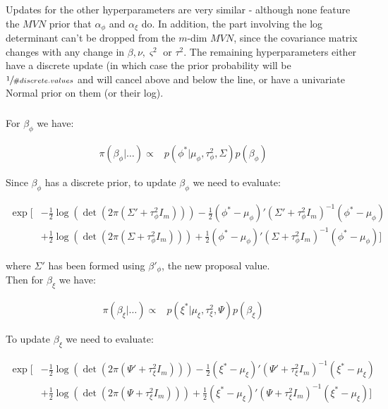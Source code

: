 \documentclass{article}
\begin{document}
Updates for the other hyperparameters are very similar - although none feature the $MVN$ prior that $\alpha_\phi$ and $\alpha_\xi$ do. In addition, the part involving the log determinant can't be dropped from the $m$-dim $MVN$, since the covariance matrix changes with any change in $\beta, \nu, \varsigma^2$ or $\tau^2$. The remaining hyperparameters either have a discrete update (in which case the prior probability will be $\sfrac{1}{\#discrete.values}$ and will cancel above and below the line, or have a univariate Normal prior on them (or their log). \\

\subsubsection*{\pmb{$\beta$}}

For $\beta_\phi$ we have:

\begin{align*}
\pi(\beta_\phi | \dots ) \propto & p(\phi^* | \mu_\phi, \tau^2_\phi, \Sigma) p(\beta_\phi)
\end{align*}

Since $\beta_\phi$ has a discrete prior, to update $\beta_\phi$ we need to evaluate:

\begin{align}
\exp \Big[ & - \frac{1}{2}  \log(\det(2 \pi (\Sigma' + \tau^2_\phi I_m))) -\frac{1}{2} (\phi^* - \mu_\phi)' (\Sigma' + \tau^2_\phi I_m)^{-1} (\phi^* - \mu_\phi) \nonumber \\
& + \frac{1}{2} \log(\det(2 \pi (\Sigma + \tau^2_\phi I_m))) + \frac{1}{2} (\phi^* - \mu_\phi)' (\Sigma + \tau^2_\phi I_m)^{-1} (\phi^* - \mu_\phi) \Big] \label{eq:2b1}
\end{align}

where $\Sigma'$ has been formed using $\beta'_\phi$, the new proposal value. \\

Then for $\beta_\xi$ we have:

\begin{align*}
\pi(\beta_\xi | \dots ) \propto & p(\xi^* | \mu_\xi, \tau^2_\xi, \Psi) p(\beta_\xi)
\end{align*}

To update $\beta_\xi$ we need to evaluate:

\begin{align}
\exp \Big[ & -\frac{1}{2} \log(\det(2 \pi (\Psi' + \tau^2_\xi I_m))) -\frac{1}{2} (\xi^* - \mu_\xi)' (\Psi' + \tau^2_\xi I_m)^{-1} (\xi^* - \mu_\xi) \nonumber \\
& + \frac{1}{2} \log(\det(2 \pi (\Psi + \tau^2_\xi I_m)))+ \frac{1}{2} (\xi^* - \mu_\xi)' (\Psi + \tau^2_\xi I_m)^{-1} (\xi^* - \mu_\xi) \Big] \label{eq:2b2}
\end{align}
\end{document}
